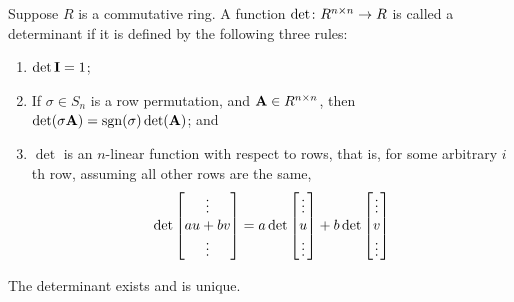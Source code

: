 \begin{definition}
    Suppose \(R\) is a commutative ring.
    A function \(\det\colon R^{n \times n}\to R\) is called a determinant
    if it is defined by the following three rules:
    \begin{enumerate}[label={(\alph*)}, itemsep=0mm]
        \item \(\det\vb{I} = 1\);
        \item If \(\sigma \in S_n\) is a row permutation,
            and \(\vb{A} \in R^{n \times n}\),
            then \(\det(\sigma\vb{A}) = \operatorname{sgn}(\sigma)\det(\vb{A})\); and
        \item \(\det\) is an \(n\)-linear function with respect to rows,
            that is, for some arbitrary \(i\)th row,
            assuming all other rows are the same,
            \begin{equation*}
                \det\begin{bmatrix} \vdots \\ au + bv \\ \vdots \end{bmatrix}
                = a\det\begin{bmatrix} \vdots \\ u \\ \vdots \end{bmatrix}
                + b\det\begin{bmatrix} \vdots \\ v \\ \vdots \end{bmatrix}
            \end{equation*}
    \end{enumerate}
\end{definition}
\begin{proposition}
    The determinant exists and is unique.
\end{proposition}
